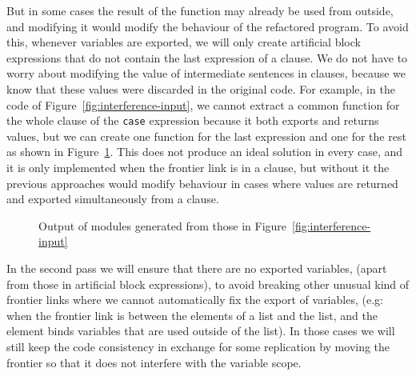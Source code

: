 But in some cases the result of the function may already be used from
outside, and modifying it would modify the behaviour of the refactored
program. To avoid this, whenever variables are exported, we will only
create artificial block expressions that do not contain the last expression
of a clause. We do not have to worry about modifying the value of
intermediate sentences in clauses, because we know that these values
were discarded in the original code. For example, in the code of 
Figure~\ref{fig:interference-input},
we cannot extract a common function for the whole clause of the \texttt{case}
expression because it both exports and returns values, but we can
create one function for the last expression and one for the rest as
shown in Figure~\ref{fig:interference-output}. This does not produce an ideal 
solution in every
case, and it is only implemented when the frontier link is in a clause,
but without it the previous approaches would modify behaviour in cases
where values are returned and exported simultaneously from a clause.

\begin{figure}
\begin{minipage}[t]{1\textwidth}%
%
\end{minipage}

\begin{minipage}[t]{1\textwidth}%
%
\end{minipage}

\begin{minipage}[t]{1\textwidth}%
%
\end{minipage}
\vspace*{-2.5mm}
\caption{Output of modules generated from those in 
Figure~\ref{fig:interference-input}\label{fig:interference-output}}
\end{figure}


In the second pass we will ensure that there are no exported variables,
(apart from those in artificial block expressions), to avoid breaking
other unusual kind of frontier links where we cannot automatically fix
the export of variables, (e.g: when the frontier link is between
the elements of a list and the list, and the element binds variables that
are used outside of the list). In those cases we will still keep the code
consistency in exchange for some replication by moving the frontier so that
it does not interfere with the variable scope.

